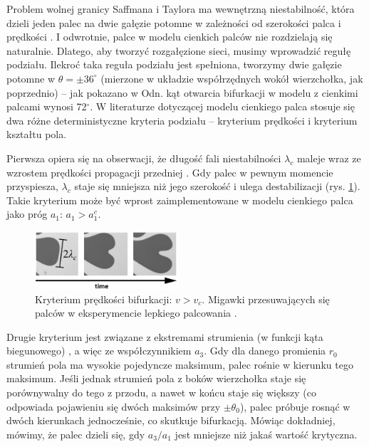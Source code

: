 \documentclass[]{pracamgr}
\begin{document}
      Problem wolnej granicy Saffmana i Taylora ma wewnętrzną niestabilność, która dzieli jeden palec na dwie gałęzie potomne w zależności od szerokości palca i prędkości \cite{lajeunesse2000tip}. I odwrotnie, palce w modelu cienkich palców nie rozdzielają się naturalnie. Dlatego, aby tworzyć rozgałęzione sieci, musimy wprowadzić regułę podziału. Ilekroć taka reguła podziału jest spełniona, tworzymy dwie gałęzie potomne w $\theta = \pm 36^\circ$ (mierzone w układzie współrzędnych wokół wierzchołka, jak poprzednio) -- jak pokazano w Odn. \cite{hastings2001growth, carleson2002laplacian, gubiec2008fingered, devauchelle2012ramification} kąt otwarcia bifurkacji w modelu z cienkimi palcami wynosi 72$^\circ$. W literaturze dotyczącej modelu cienkiego palca stosuje się dwa różne deterministyczne kryteria podziału – kryterium prędkości i kryterium kształtu pola.

      Pierwsza opiera się na obserwacji, że długość fali niestabilności $\lambda_c$ maleje wraz ze wzrostem prędkości propagacji przedniej \cite{pecelerowicz2016stabilizing}. Gdy palec w pewnym momencie przyspiesza, $\lambda_c$ staje się mniejsza niż jego szerokość i ulega destabilizacji (rys. \ref{wavelength}). Takie kryterium może być wprost zaimplementowane w modelu cienkiego palca jako próg $a_1$: $a_1 > a_1^c$.
      \begin{figure}[H]
        \centering
        \includegraphics[width=0.475\textwidth]{figs/wavelength.png}
        \vspace{-10pt}
        \caption{Kryterium prędkości bifurkacji: $v > v_{c}$. Migawki przesuwających się palców w eksperymencie lepkiego palcowania \cite{bischofberger2015island}.}
        \label{wavelength}
      \end{figure}

      Drugie kryterium jest związane z ekstremami strumienia (w funkcji kąta biegunowego) \cite{petroff2013bifurcation, kaandorp2001algorithmic_Chapter4.4}, a więc ze współczynnikiem $a_3$. Gdy dla danego promienia $r_0$ strumień pola ma wysokie pojedyncze maksimum, palec rośnie w kierunku tego maksimum. Jeśli jednak strumień pola z boków wierzchołka staje się porównywalny do tego z przodu, a nawet w końcu staje się większy (co odpowiada pojawieniu się dwóch maksimów przy $\pm \theta_0$), palec próbuje rosnąć w dwóch kierunkach jednocześnie, co skutkuje bifurkacją. Mówiąc dokładniej, mówimy, że palec dzieli się, gdy $a_3/a_1$ jest mniejsze niż jakaś wartość krytyczna.
\end{document}
